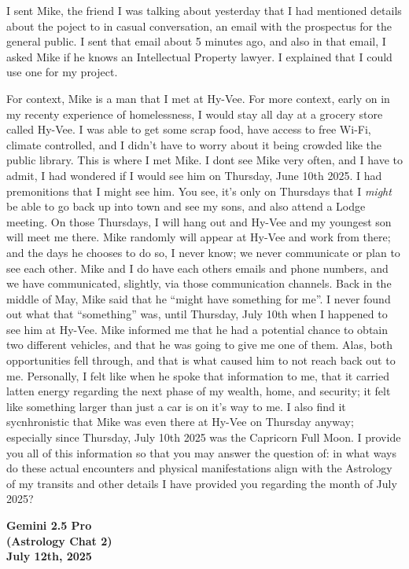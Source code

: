 \documentclass{article}
\begin{document}
I sent Mike, the friend I was talking about yesterday that I had mentioned details about the poject to in casual conversation, an email with the prospectus for the general public. I sent that email about 5 minutes ago, and also in that email, I asked Mike if he knows an Intellectual Property lawyer. I explained that I could use one for my project.

For context, Mike is a man that I met at Hy-Vee. For more context, early on in my recenty experience of homelessness, I would stay all day at a grocery store called Hy-Vee. I was able to get some scrap food, have access to free Wi-Fi, climate controlled, and I didn't have to worry about it being crowded like the public library. This is where I met Mike. I dont see Mike very often, and I have to admit, I had wondered if I would see him on Thursday, June 10th 2025. I had premonitions that I might see him. You see, it's only on Thursdays that I \emph{might} be able to go back up into town and see my sons, and also attend a Lodge meeting. On those Thursdays, I will hang out and Hy-Vee and my youngest son will meet me there. Mike randomly will appear at Hy-Vee and work from there; and the days he chooses to do so, I never know; we never communicate or plan to see each other. Mike and I do have each others emails and phone numbers, and we have communicated, slightly, via those communication channels. Back in the middle of May, Mike said that he ``might have something for me''. I never found out what that ``something'' was, until Thursday, July 10th when I happened to see him at Hy-Vee. Mike informed me that he had a potential chance to obtain two different vehicles, and that he was going to give me one of them. Alas, both opportunities fell through, and that is what caused him to not reach back out to me. Personally, I felt like when he spoke that information to me, that it carried latten energy regarding the next phase of my wealth, home, and security; it felt like something larger than just a car is on it's way to me. I also find it sycnhronistic that Mike was even there at Hy-Vee on Thursday anyway; especially since Thursday, July 10th 2025 was the Capricorn Full Moon. I provide you all of this information so that you may answer the question of: in what ways do these actual encounters and physical manifestations align with the Astrology of my transits and other details I have provided you regarding the month of July 2025?

\begin{center}
\textbf{Gemini 2.5 Pro}\\
\textbf{(Astrology Chat 2)}\\
\textbf{July 12th, 2025}
\end{center}
\end{document}
